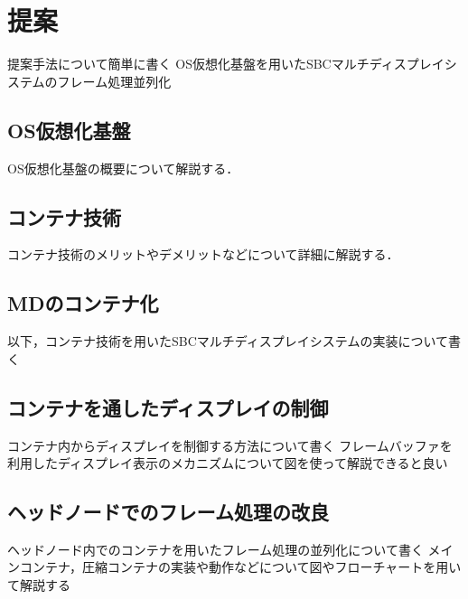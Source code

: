 \chapter{提案}
提案手法について簡単に書く
OS仮想化基盤を用いたSBCマルチディスプレイシステムのフレーム処理並列化

\section{OS仮想化基盤}
OS仮想化基盤の概要について解説する．

\section{コンテナ技術}
コンテナ技術のメリットやデメリットなどについて詳細に解説する．

\section{MDのコンテナ化}
以下，コンテナ技術を用いたSBCマルチディスプレイシステムの実装について書く

\section{コンテナを通したディスプレイの制御}
コンテナ内からディスプレイを制御する方法について書く
フレームバッファを利用したディスプレイ表示のメカニズムについて図を使って解説できると良い


\section{ヘッドノードでのフレーム処理の改良}
ヘッドノード内でのコンテナを用いたフレーム処理の並列化について書く
メインコンテナ，圧縮コンテナの実装や動作などについて図やフローチャートを用いて解説する


